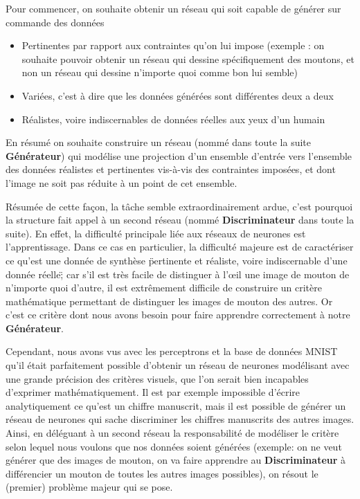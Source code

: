 Pour commencer, on souhaite obtenir un réseau qui soit capable de générer sur commande des données 
\begin{itemize}
    \item Pertinentes par rapport aux contraintes qu'on lui impose (exemple : on souhaite pouvoir obtenir un réseau qui dessine spécifiquement des moutons, et non un réseau qui dessine n'importe quoi comme bon lui semble)
    \item Variées, c'est à dire que les données générées sont différentes deux a deux
    \item Réalistes, voire indiscernables de données réelles aux yeux d'un humain \\
\end{itemize} 

En résumé on souhaite construire un réseau (nommé dans toute la suite \textbf{Générateur}) qui modélise une projection d'un ensemble d'entrée vers l'ensemble des données réalistes et pertinentes vis-à-vis des contraintes imposées, et dont l'image ne soit pas réduite à un point de cet ensemble.

Résumée de cette façon, la tâche semble extraordinairement ardue, c'est pourquoi la structure fait appel à un second réseau (nommé \textbf{Discriminateur} dans toute la suite). En effet, la difficulté principale liée aux réseaux de neurones est l'apprentissage. Dans ce cas en particulier, la difficulté majeure  est de caractériser ce qu'est une donnée de synthèse \"pertinente et réaliste, voire indiscernable d'une donnée réelle\"; car s'il est très facile de distinguer à l’œil une image de mouton de n'importe quoi d'autre, il est extrêmement difficile de construire un critère mathématique permettant de distinguer les images de mouton des autres. Or c'est ce critère dont nous avons besoin pour faire apprendre correctement à notre \textbf{Générateur}.

Cependant, nous avons vus avec les perceptrons et la base de données MNIST qu'il était parfaitement possible d'obtenir un réseau de neurones modélisant avec une grande précision des critères visuels, que l'on serait bien incapables d'exprimer mathématiquement. Il est par exemple impossible d'écrire analytiquement ce qu'est un chiffre manuscrit, mais il est possible de générer un réseau de neurones qui sache discriminer les chiffres manuscrits des autres images. Ainsi, en déléguant à un second réseau la responsabilité de modéliser le critère selon lequel nous voulons que nos données soient générées (exemple: on ne veut générer que des images de mouton, on va faire apprendre au \textbf{Discriminateur} à différencier un mouton de toutes les autres images possibles), on résout le (premier) problème majeur qui se pose. 

